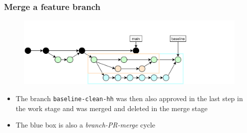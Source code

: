 \documentclass[aspectratio=169]{beamer} %
\begin{document}
\begin{frame}
	\frametitle{Merge a feature branch}

	\vspace{-.5cm}
	\begin{minipage}[t][5cm][t]{\textwidth}
		\begin{figure}
			\centering
			\includegraphics[width=\textwidth]{./img/dime-gitflow-network-2-5.png}
		\end{figure}
	\end{minipage}

	\vspace{-.5cm}
	\begin{minipage}[t][5cm][t]{\textwidth}
		\begin{itemize}
			\setlength\itemsep{.5em}
			\item The branch \texttt{baseline-clean-hh} was then
			also approved in the last step in the work stage and
			was merged and deleted in the merge stage
			\item The blue box is also a \textit{branch-PR-merge} cycle
		\end{itemize}
	\end{minipage}
\end{frame}
\end{document}
